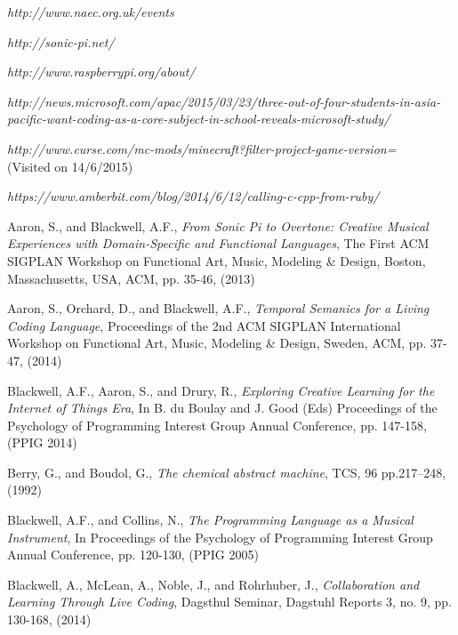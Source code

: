 \documentclass[11pt, abstracton, twoside, titlepage=true]{scrartcl}
\begin{document}
\begin{thebibliography}{9}
\thispagestyle{empty}

  \emph{http://www.naec.org.uk/events}

  \emph{http://sonic-pi.net/}

  \emph{http://www.raspberrypi.org/about/}

  \emph{http://news.microsoft.com/apac/2015/03/23/three-out-of-four-students-in-asia-pacific-want-coding-as-a-core-subject-in-school-reveals-microsoft-study/}

  \emph{http://www.curse.com/mc-mods/minecraft?filter-project-game-version=} \\
  (Visited on 14/6/2015)

  \emph{https://www.amberbit.com/blog/2014/6/12/calling-c-cpp-from-ruby/}

  Aaron, S., and Blackwell, A.F.,
  \emph{From Sonic Pi to Overtone: Creative Musical Experiences with Domain-Specific and Functional Languages},
  The First ACM SIGPLAN Workshop on Functional Art, Music, Modeling \& Design,
  Boston, Massachusetts, USA,
  ACM, pp. 35-46,
  (2013)

  Aaron, S., Orchard, D., and Blackwell, A.F.,
  \emph{Temporal Semanics for a Living Coding Language},
  Proceedings of the 2nd ACM SIGPLAN International Workshop on Functional Art, Music, Modeling \& Design,
  Sweden, ACM, pp. 37-47,
  (2014)

  Blackwell, A.F., Aaron, S., and Drury, R., 
  \emph{Exploring Creative Learning for the Internet of Things Era},
  In B. du Boulay and J. Good (Eds) Proceedings of the Psychology of Programming Interest Group Annual Conference, 
  pp. 147-158,
  (PPIG 2014)

  Berry, G., and Boudol, G.,
  \emph{The chemical abstract machine},
  TCS, 96 pp.217–248, 
  (1992)

  Blackwell, A.F., and Collins, N.,
  \emph{The Programming Language as a Musical Instrument},
  In Proceedings of the Psychology of Programming Interest Group Annual Conference,
  pp. 120-130,
  (PPIG 2005)

  Blackwell, A., McLean, A., Noble, J., and Rohrhuber, J.,
  \emph{Collaboration and Learning Through Live Coding},
  Dagsthul Seminar, Dagstuhl Reports 3,
  no. 9, pp. 130-168,
  (2014)


\end{thebibliography}
\end{document}
